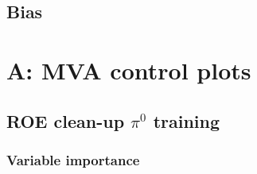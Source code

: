 \documentclass[headings=standardclasses,headings=big,oneside,a4paper,openany,12pt]{scrbook}
\begin{document}
\section{Bias}

\printbibliography

\chapter*{A: MVA control plots}
\section*{ROE clean-up $\pi^0$ training}

\subsection*{Variable importance}
\end{document}

